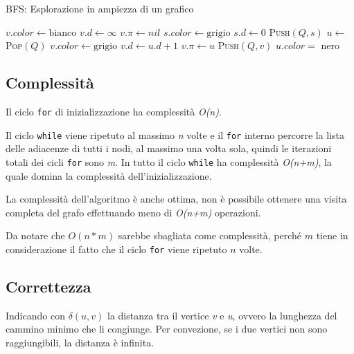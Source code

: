 \begin{breakablealgorithm}
	\caption{BFS: Esplorazione in ampiezza di un grafico}
	\begin{algorithmic}[1]
				\State $ v.color \gets \text{bianco} $ 
				\State $ v.d \gets \infty $ 
				\State $ v.\pi \gets nil $
			\EndFor
			\State $ s.color \gets \text{grigio} $
			\State $ s.d \gets 0 $
			\State \textsc{Push}$ (Q,s)$
				\State $ u \gets $ \textsc{Pop}$ (Q) $
						\State $ v.color \gets \text{grigio} $ 
						\State $ v.d \gets u.d + 1 $
						\State $ v.\pi \gets u $
						\State \textsc{Push}$ (Q,v) $
					\EndIf
				\EndFor
				\State $ u.color = $ nero
			\EndWhile
		\EndFunction
	\end{algorithmic}
\end{breakablealgorithm}

\subsection{Complessità}\label{complessituxe0}

Il ciclo \texttt{for} di inizializzazione ha complessità \emph{O(n)}.

Il ciclo \texttt{while} viene ripetuto al massimo \emph{n} volte e il
\texttt{for} interno percorre la lista delle adiacenze di tutti i nodi,
al massimo una volta sola, quindi le iterazioni totali dei cicli
\texttt{for} sono \emph{m}. In tutto il ciclo
\texttt{while} ha complessità \emph{O(n+m)}, la quale domina la
complessità dell'inizializzazione.

La complessità dell'algoritmo è anche ottima, non è possibile ottenere
una visita completa del grafo effettuando meno di \emph{O(n+m)}
operazioni.

Da notare che $O(n*m)$ sarebbe sbagliata come complessità, perché $m$
tiene in considerazione il fatto che il ciclo \texttt{for} viene
ripetuto $n$ volte.

\subsection{Correttezza}\label{correttezza}

Indicando con $\delta(u,v)$ la distanza tra il vertice \emph{v} e
\emph{u}, ovvero la lunghezza del cammino minimo che li congiunge. Per
convezione, se i due vertici non sono raggiungibili, la distanza è
infinita.

